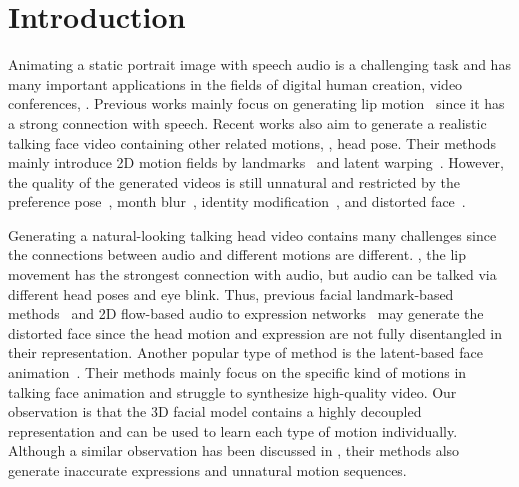 \section{Introduction}
\label{sec:intro}
Animating a static portrait image with speech audio is a challenging task and has many important applications in the fields of digital human creation, video conferences, \etc. Previous works mainly focus on generating lip motion~\cite{atvgnet, lipgan, wav2lip, pcavs,videoretalking} since it has a strong connection with speech. Recent works also aim to generate a realistic talking face video containing other related motions, \eg, head pose. Their methods mainly introduce 2D motion fields by landmarks~\cite{zhou2020makelttalk} and latent warping~\cite{wang2021audio2head, wang2021one}. However, the quality of the generated videos is still unnatural and restricted by the preference pose~\cite{pcavs, eamm}, month blur~\cite{wav2lip}, identity modification~\cite{wang2021audio2head, wang2021one}, and distorted face~\cite{wang2021audio2head, wang2021one, hdtf}. 

Generating a natural-looking talking head video contains many challenges since the connections between audio and different motions are different. \ie, the lip movement has the strongest connection with audio, but audio can be talked via different head poses and eye blink. Thus, previous facial landmark-based methods~\cite{zhou2020makelttalk,atvgnet} and 2D flow-based audio to expression networks~\cite{wang2021one, wang2021audio2head} may generate the distorted face since the head motion and expression are not fully disentangled in their representation. Another popular type of method is the latent-based face animation~\cite{wav2lip, videoretalking, pcavs, eamm}. Their methods mainly focus on the specific 
kind of motions in talking face animation and struggle to synthesize high-quality video. Our observation is that the 3D facial model contains a highly decoupled representation and can be used to learn each type of motion individually. Although a similar observation has been discussed in \cite{hdtf}, their methods also generate inaccurate expressions and unnatural motion sequences.

